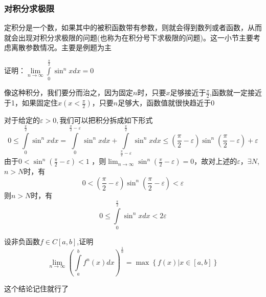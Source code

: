 \documentclass[lang=cn,10pt]{elegantbook}
\begin{document}
\subsubsection{对积分求极限}
定积分是一个数，如果其中的被积函数带有参数，则就会得到数列或者函数，从而就会出现对积分求极限的问题(也称为在积分号下求极限的问题)。这一小节主要考虑离散参数情况。主要是例题为主
\begin{example}
	证明：$\underset{n\rightarrow \infty}{\lim}\int\limits_0^{\frac{\pi}{2}}{\sin ^nxdx}=0$
\end{example}
\begin{solution}
	
	像这种积分，我们要分而治之，因为固定$n$时，只要$x$足够接近于$\frac{\pi}{2}$,函数就一定接近于1，如果固定住$x(x<\frac{\pi}{2})$，只要$n$足够大，函数值就很快趋近于0
	
	对于给定的$\varepsilon >0,\text{我们可以把积分拆成如下形式}$
	\begin{equation*}
		0\le \int\limits_0^{\frac{\pi}{2}}{\sin ^nxdx}=\int\limits_0^{\frac{\pi}{2}-\varepsilon}{\sin ^nxdx}+\int\limits_{\frac{\pi}{2}-\varepsilon}^{\frac{\pi}{2}}{\sin ^nxdx}\le \left( \frac{\pi}{2}-\varepsilon \right) \sin ^n\left( \frac{\pi}{2}-\varepsilon \right) +\varepsilon 
	\end{equation*}
	由于$0<
	\sin ^n\left( \frac{\pi}{2}-\varepsilon \right)<1$ ，则$\lim_{n\rightarrow \infty} \sin ^n\left( \frac{\pi}{2}-\varepsilon \right) =0$，故对上述的$\varepsilon $，$\exists N$,$n>N$时，有
	\begin{equation*}
		0<\left( \frac{\pi}{2}-\varepsilon \right) \sin ^n\left( \frac{\pi}{2}-\varepsilon \right)<\varepsilon
	\end{equation*}
	则$n>N$时，有
	\begin{equation*}
		0\le \int\limits_0^{\frac{\pi}{2}}{\sin ^nxdx}<2\varepsilon 
	\end{equation*}
\end{solution}
\begin{example}
	设非负函数$f\in C[a,b]$,证明
	\begin{equation*}
		\underset{n\rightarrow \infty}{\lim}\left( \int\limits_a^b{f^n\left( x \right) dx} \right) ^{\frac{1}{n}}=\max \left\{ f\left( x \right) |x\in \left[ a,b \right] \right\} 
	\end{equation*}
\end{example}
\begin{solution}
	
	这个结论记住就行了
\end{solution}
\end{document}
